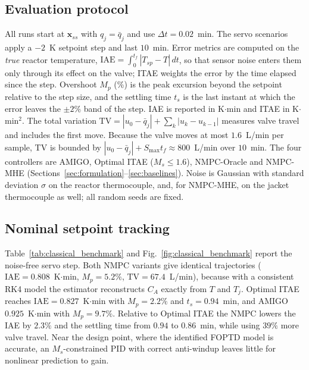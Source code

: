 
\subsection{Evaluation protocol}
\label{subsec:protocol}
All runs start at $\mathbf{x}_{ss}$ with $q_j = \bar q_j$ and use $\Delta t = 0.02$~min. The servo scenarios apply a $-2$~K setpoint step and last $10$~min. Error metrics are computed on the \emph{true} reactor temperature, $\mathrm{IAE} = \int_0^{t_f} |T_{sp} - T|\,dt$, so that sensor noise enters them only through its effect on the valve; ITAE weights the error by the time elapsed since the step. Overshoot $M_p$ (\%) is the peak excursion beyond the setpoint relative to the step size, and the settling time $t_s$ is the last instant at which the error leaves the $\pm 2\%$ band of the step. IAE is reported in K$\cdot$min and ITAE in K$\cdot$min$^2$. The total variation $\mathrm{TV} = |u_0 - \bar q_j| + \sum_k |u_k - u_{k-1}|$ measures valve travel and includes the first move. Because the valve moves at most $1.6$~L/min per sample, TV is bounded by $|u_0 - \bar q_j| + S_{\max} t_f \approx 800$~L/min over $10$~min. The four controllers are AMIGO, Optimal ITAE ($M_s \le 1.6$), NMPC-Oracle and NMPC-MHE (Sections~\ref{sec:formulation}--\ref{sec:baselines}). Noise is Gaussian with standard deviation $\sigma$ on the reactor thermocouple, and, for NMPC-MHE, on the jacket thermocouple as well; all random seeds are fixed.

\subsection{Nominal setpoint tracking}
\label{subsec:nominal}
Table~\ref{tab:classical_benchmark} and Fig.~\ref{fig:classical_benchmark} report the noise-free servo step. Both NMPC variants give identical trajectories ($\mathrm{IAE} = 0.808$~K$\cdot$min, $M_p = 5.2\%$, $\mathrm{TV} = 67.4$~L/min), because with a consistent RK4 model the estimator reconstructs $C_A$ exactly from $T$ and $T_j$. Optimal ITAE reaches $\mathrm{IAE} = 0.827$~K$\cdot$min with $M_p = 2.2\%$ and $t_s = 0.94$~min, and AMIGO $0.925$~K$\cdot$min with $M_p = 9.7\%$. Relative to Optimal ITAE the NMPC lowers the IAE by $2.3\%$ and the settling time from $0.94$ to $0.86$~min, while using $39\%$ more valve travel. Near the design point, where the identified FOPTD model is accurate, an $M_s$-constrained PID with correct anti-windup leaves little for nonlinear prediction to gain.


